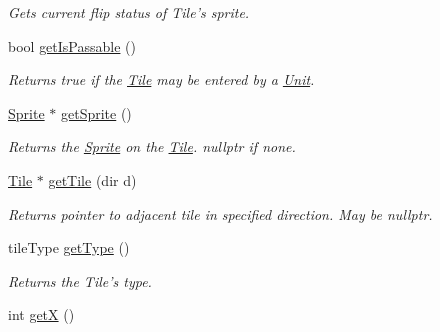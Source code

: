 \begin{DoxyCompactItemize}
\begin{DoxyCompactList}\small\item\em Gets current flip status of Tile’s sprite. \end{DoxyCompactList}\item 
bool \hyperlink{class_tile_aaddc2d065a537489c31de4a566bb0bd5}{get\+Is\+Passable} ()\hypertarget{class_tile_aaddc2d065a537489c31de4a566bb0bd5}{}\label{class_tile_aaddc2d065a537489c31de4a566bb0bd5}

\begin{DoxyCompactList}\small\item\em Returns true if the \hyperlink{class_tile}{Tile} may be entered by a \hyperlink{class_unit}{Unit}. \end{DoxyCompactList}\item 
\hyperlink{class_sprite}{Sprite} $\ast$ \hyperlink{class_tile_a42f98bf8592783e96f42d6889a8d7e4f}{get\+Sprite} ()\hypertarget{class_tile_a42f98bf8592783e96f42d6889a8d7e4f}{}\label{class_tile_a42f98bf8592783e96f42d6889a8d7e4f}

\begin{DoxyCompactList}\small\item\em Returns the \hyperlink{class_sprite}{Sprite} on the \hyperlink{class_tile}{Tile}. nullptr if none. \end{DoxyCompactList}\item 
\hyperlink{class_tile}{Tile} $\ast$ \hyperlink{class_tile_ae5038e62f2a4c28150f6abb4deb31433}{get\+Tile} (dir d)\hypertarget{class_tile_ae5038e62f2a4c28150f6abb4deb31433}{}\label{class_tile_ae5038e62f2a4c28150f6abb4deb31433}

\begin{DoxyCompactList}\small\item\em Returns pointer to adjacent tile in specified direction. May be nullptr. \end{DoxyCompactList}\item 
tile\+Type \hyperlink{class_tile_a36871de25627c7483c31807da1c28706}{get\+Type} ()\hypertarget{class_tile_a36871de25627c7483c31807da1c28706}{}\label{class_tile_a36871de25627c7483c31807da1c28706}

\begin{DoxyCompactList}\small\item\em Returns the Tile’s type. \end{DoxyCompactList}\item 
int \hyperlink{class_tile_a25b90e07fd9cdaba1df3ac2a9b6d032b}{getX} ()\hypertarget{class_tile_a25b90e07fd9cdaba1df3ac2a9b6d032b}{}\label{class_tile_a25b90e07fd9cdaba1df3ac2a9b6d032b}


\end{DoxyCompactItemize}
